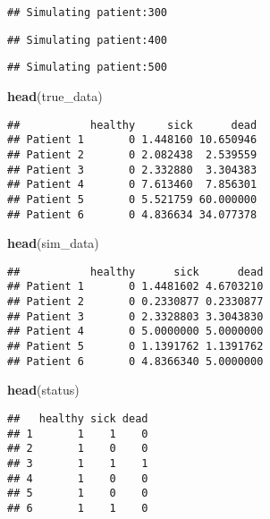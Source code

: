 \documentclass[
]{article}
\newenvironment{Shaded}{\begin{snugshade}}{\end{snugshade}}
\newcommand{\KeywordTok}[1]{\textcolor[rgb]{0.13,0.29,0.53}{\textbf{#1}}}
\newcommand{\NormalTok}[1]{#1}
\begin{document}
\begin{verbatim}
## Simulating patient:300
\end{verbatim}

\begin{verbatim}
## Simulating patient:400
\end{verbatim}

\begin{verbatim}
## Simulating patient:500
\end{verbatim}

\begin{Shaded}
\begin{Highlighting}[]
\KeywordTok{head}\NormalTok{(true_data)}
\end{Highlighting}
\end{Shaded}

\begin{verbatim}
##           healthy     sick      dead
## Patient 1       0 1.448160 10.650946
## Patient 2       0 2.082438  2.539559
## Patient 3       0 2.332880  3.304383
## Patient 4       0 7.613460  7.856301
## Patient 5       0 5.521759 60.000000
## Patient 6       0 4.836634 34.077378
\end{verbatim}

\begin{Shaded}
\begin{Highlighting}[]
\KeywordTok{head}\NormalTok{(sim_data)}
\end{Highlighting}
\end{Shaded}

\begin{verbatim}
##           healthy      sick      dead
## Patient 1       0 1.4481602 4.6703210
## Patient 2       0 0.2330877 0.2330877
## Patient 3       0 2.3328803 3.3043830
## Patient 4       0 5.0000000 5.0000000
## Patient 5       0 1.1391762 1.1391762
## Patient 6       0 4.8366340 5.0000000
\end{verbatim}

\begin{Shaded}
\begin{Highlighting}[]
\KeywordTok{head}\NormalTok{(status)}
\end{Highlighting}
\end{Shaded}

\begin{verbatim}
##   healthy sick dead
## 1       1    1    0
## 2       1    0    0
## 3       1    1    1
## 4       1    0    0
## 5       1    0    0
## 6       1    1    0
\end{verbatim}
\end{document}
